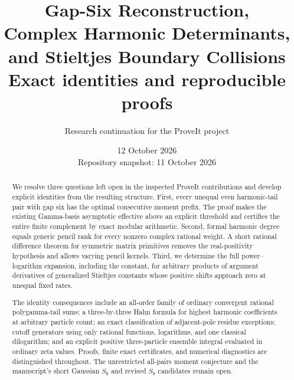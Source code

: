 \documentclass[11pt,a4paper]{article}
\title{\LARGE\bfseries Gap-Six Reconstruction,\\[3pt]
 Complex Harmonic Determinants,\\[3pt]
 and Stieltjes Boundary Collisions\\[10pt]
 \large Exact identities and reproducible proofs}
\author{Research continuation for the ProveIt project}
\date{12 October 2026\\[3pt]\small Repository snapshot: 11 October 2026}
\theoremstyle{definition}
\theoremstyle{remark}
\numberwithin{equation}{section}
\begin{document}
\maketitle
\begin{abstract}
We resolve three questions left open in the inspected ProveIt
contributions and develop explicit identities from the resulting
structure. First, every unequal even harmonic-tail pair with gap
six has the optimal consecutive moment prefix. The proof makes
the existing Gamma-basis asymptotic effective above an explicit
threshold and certifies the entire finite complement by exact
modular arithmetic. Second, formal harmonic degree equals generic
pencil rank for every nonzero complex rational weight. A short
rational difference theorem for symmetric matrix primitives removes
the real-positivity hypothesis and allows varying pencil kernels.
Third, we determine the full power--logarithm expansion, including
the constant, for arbitrary products of argument derivatives of
generalized Stieltjes constants whose positive shifts approach zero
at unequal fixed rates.

The identity consequences include an all-order family of ordinary
convergent rational polygamma-tail sums; a three-by-three Hahn
formula for highest harmonic coefficients at arbitrary particle
count; an exact classification of adjacent-pole residue exceptions;
cutoff generators using only rational functions, logarithms, and
one classical dilogarithm; and an explicit positive three-particle
ensemble integral evaluated in ordinary zeta values. Proofs,
finite exact certificates, and numerical diagnostics are distinguished
throughout. The unrestricted all-pairs moment conjecture and the
manuscript's short Gaussian $S_6$ and revised $S_8$ candidates
remain open.
\end{abstract}
\clearpage
\begingroup
\small
\tableofcontents
\endgroup
\clearpage






\appendix




\end{document}
